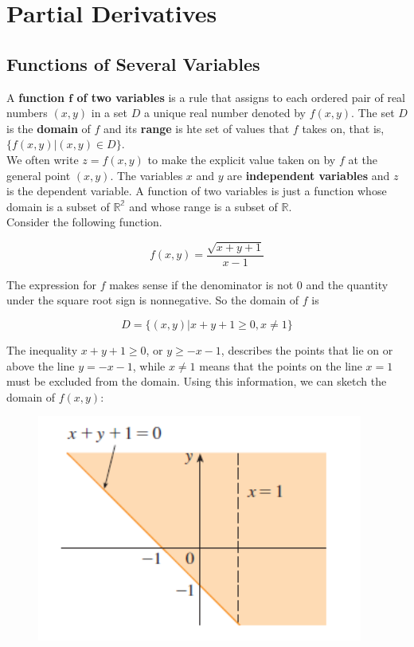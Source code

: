 \section{Partial Derivatives}

    \subsection{Functions of Several Variables}     %

        A \textbf{function $\mathbf{f}$ of two variables} is a rule that assigns to each ordered pair of real numbers $(x,y)$ in a set $D$ a unique real number denoted by $f(x,y)$. The set $D$ is the \textbf{domain} of
        $f$ and its \textbf{range} is hte set of values that $f$ takes on, that is, $\{f(x,y)|(x,y) \in D\}$. \\

        We often write $z=f(x,y)$ to make the explicit value taken on by $f$ at the general point $(x,y)$. The variables $x$ and $y$ are \textbf{independent variables} and $z$ is the dependent variable. A function of
        two variables is just a function whose domain is a subset of $\mathbb{R^2}$ and whose range is a subset of $\mathbb{R}$. \\

        \textit{} Consider the following function.

        \[
            f(x,y) = \frac{\sqrt{x+y+1}}{x-1}
        \]

        The expression for $f$ makes sense if the denominator is not 0 and the quantity under the square root sign is nonnegative. So the domain of $f$ is 

        \[
            D = \{(x,y)|x+y+1\geq 0, x\not = 1\}
        \]

        The inequality $x+y+1\geq 0$, or $y\geq -x-1$, describes the points that lie on or above the line $y=-x-1$, while $x\not = 1$ means that the points on the line $x=1$ must be excluded from the domain. Using this
        information, we can sketch the domain of $f(x,y)$:

        \begin{figure}[hbt!]
            \centering
            \includegraphics[scale = 0.75]{Resources/14.1_Domain_Sketch}
        \end{figure}

